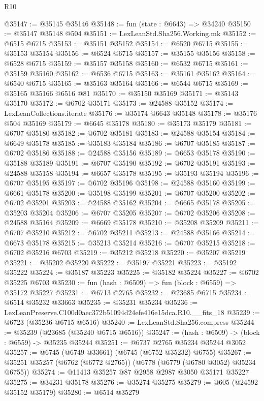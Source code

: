 \begin{lexlean}{R10}
\begin{coremodule}
@35147 := @35145 @35146
@35148 := fun (state : @6643) => @34240
@35150 := @35147 @35148 @504
@35151 := LexLeanStd.Sha256.Working.mk
@35152 := @6515 @6715
@35153 := @35151 @35152
@35154 := @6520 @6715
@35155 := @35153 @35154
@35156 := @6524 @6715
@35157 := @35155 @35156
@35158 := @6528 @6715
@35159 := @35157 @35158
@35160 := @6532 @6715
@35161 := @35159 @35160
@35162 := @6536 @6715
@35163 := @35161 @35162
@35164 := @6540 @6715
@35165 := @35163 @35164
@35166 := @6544 @6715
@35169 := @35165 @35166 @6516 @81
@35170 := @35150 @35169
@35171 := @35143 @35170
@35172 := @6702 @35171
@35173 := @24588 @35152
@35174 := LexLeanCollections.iterate
@35176 := @35174 @6643 @35148
@35178 := @35176 @504 @35169
@35179 := @6645 @35178
@35180 := @35173 @35179
@35181 := @6707 @35180
@35182 := @6702 @35181
@35183 := @24588 @35154
@35184 := @6649 @35178
@35185 := @35183 @35184
@35186 := @6707 @35185
@35187 := @6702 @35186
@35188 := @24588 @35156
@35189 := @6653 @35178
@35190 := @35188 @35189
@35191 := @6707 @35190
@35192 := @6702 @35191
@35193 := @24588 @35158
@35194 := @6657 @35178
@35195 := @35193 @35194
@35196 := @6707 @35195
@35197 := @6702 @35196
@35198 := @24588 @35160
@35199 := @6661 @35178
@35200 := @35198 @35199
@35201 := @6707 @35200
@35202 := @6702 @35201
@35203 := @24588 @35162
@35204 := @6665 @35178
@35205 := @35203 @35204
@35206 := @6707 @35205
@35207 := @6702 @35206
@35208 := @24588 @35164
@35209 := @6669 @35178
@35210 := @35208 @35209
@35211 := @6707 @35210
@35212 := @6702 @35211
@35213 := @24588 @35166
@35214 := @6673 @35178
@35215 := @35213 @35214
@35216 := @6707 @35215
@35218 := @6702 @35216 @6703
@35219 := @35212 @35218
@35220 := @35207 @35219
@35221 := @35202 @35220
@35222 := @35197 @35221
@35223 := @35192 @35222
@35224 := @35187 @35223
@35225 := @35182 @35224
@35227 := @6702 @35225 @6703
@35230 := fun (hash : @6509) => fun (block : @6559) => @35172 @35227
@35231 := @6713 @2765
@35232 := @23685 @6715
@35234 := @6514 @35232 @33663
@35235 := @35231 @35234
@35236 := LexLeanPreserve.C100d0aec372b51094d24efe416e15dca.R10.__fits_18
@35239 := @6723 (@35236 @6715 @6516)
@35240 := LexLeanStd.Sha256.compress
@35244 := @35239 (@23685 (@35240 @6715 @6516))
@35247 := (hash : @6509) -> (block : @6559) -> @35235 @35244
@35251 := @6737 @2765 @35234 @35244 @3052
@35257 := @6745 (@6749 @33661) (@6745 (@6752 @35232) @6755)
@35267 := @35251 @35257 (@6762 (@6772 @2765)) (@6778 (@6779 (@6780 @3052) @35234 @6755))
@35274 := @11413 @35257 @87 @2958 @2987 @3050 @35171 @35227
@35275 := @34231 @35178
@35276 := @35274 @35275
@35279 := @605 (@24592 @35152 @35179)
@35280 := @6514 @35279

\end{coremodule}
\end{lexlean}
